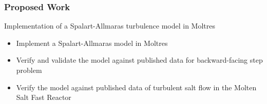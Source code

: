 \begin{frame}
  \frametitle{Proposed Work}
  \begin{block}{Implementation of a Spalart-Allmaras turbulence model in Moltres}
    \begin{itemize}
      \item Implement a Spalart-Allmaras model in Moltres
      \item Verify and validate the model against published data for backward-facing step problem
      \item Verify the model against published data of turbulent salt flow in the Molten Salt Fast
        Reactor
    \end{itemize}
  \end{block}
\end{frame}
